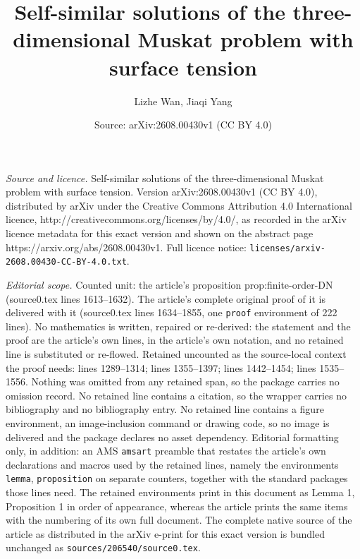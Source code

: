 \documentclass[10pt,a4paper]{amsart}
\title{Self-similar solutions of the three-dimensional Muskat problem with surface tension}
\author{Lizhe Wan, Jiaqi Yang}
\date{Source: arXiv:2608.00430v1 (CC BY 4.0)}
\begin{document}
\maketitle

\noindent\emph{Source and licence.} Self-similar solutions of the three-dimensional Muskat problem with surface tension. Version arXiv:2608.00430v1 (CC BY 4.0), distributed by arXiv under the Creative Commons Attribution 4.0 International licence, http://creativecommons.org/licenses/by/4.0/, as recorded in the arXiv licence metadata for this exact version and shown on the abstract page https://arxiv.org/abs/2608.00430v1. Full licence notice: \texttt{licenses/arxiv-2608.00430-CC-BY-4.0.txt}.\par\smallskip

\noindent\textit{Editorial scope.} Counted unit: the article's proposition prop:finite-order-DN (source0.tex lines 1613--1632). The article's complete original proof of it is delivered with it (source0.tex lines 1634--1855, one \texttt{proof} environment of 222 lines). No mathematics is written, repaired or re-derived: the statement and the proof are the article's own lines, in the article's own notation, and no retained line is substituted or re-flowed.  Retained uncounted as the source-local context the proof needs: lines 1289--1314; lines 1355--1397; lines 1442--1454; lines 1535--1556.  Nothing was omitted from any retained span, so the package carries no omission record.  No retained line contains a citation, so the wrapper carries no bibliography and no bibliography entry.  No retained line contains a figure environment, an image-inclusion command or drawing code, so no image is delivered and the package declares no asset dependency.  Editorial formatting only, in addition: an AMS \texttt{amsart} preamble that restates the article's own declarations and macros used by the retained lines, namely the environments \texttt{lemma}, \texttt{proposition} on separate counters, together with the standard packages those lines need.  The retained environments print in this document as Lemma 1, Proposition 1 in order of appearance, whereas the article prints the same items with the numbering of its own full document.  The complete native source of the article as distributed in the arXiv e-print for this exact version is bundled unchanged as \texttt{sources/206540/source0.tex}.
\end{document}
